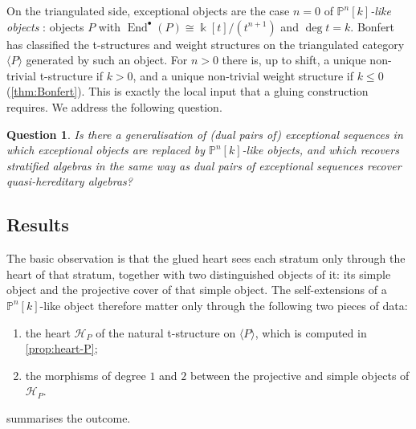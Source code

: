 \documentclass[11pt,reqno]{amsart}
\theoremstyle{plain}
\newtheorem{question}[theorem]{Question}
\theoremstyle{definition}
\theoremstyle{remark}
\newcommand{\kk}{\Bbbk}
\DeclareMathOperator{\End}{End}
\newcommand{\thick}[1]{\langle #1\rangle}
\newcommand{\Pn}[2]{\mathbb{P}^{#1}[#2]}
\newcommand{\cH}{\mathcal{H}}
\begin{document}
On the triangulated side, exceptional objects are the case $n=0$ of \emph{$\Pn{n}{k}$-like objects} \cite{HT06,Kru18,HK19}: objects $P$ with $\End^\bullet(P)\cong\kk[t]/(t^{n+1})$ and $\deg t=k$. Bonfert \cite{Bonf26} has classified the t-structures and weight structures on the triangulated category $\thick{P}$ generated by such an object. For $n>0$ there is, up to shift, a unique non-trivial t-structure if $k>0$, and a unique non-trivial weight structure if $k\le0$ (\cref{thm:Bonfert}). This is exactly the local input that a gluing construction requires. We address the following question.

\begin{question}\label{q:main}
Is there a generalisation of (dual pairs of) exceptional sequences in which exceptional objects are replaced by $\Pn{n}{k}$-like objects, and which recovers stratified algebras in the same way as dual pairs of exceptional sequences recover quasi-hereditary algebras?
\end{question}

\subsection{Results}
The basic observation is that the glued heart sees each stratum only through the heart of that stratum, together with two distinguished objects of it: its simple object and the projective cover of that simple object. The self-extensions of a $\Pn{n}{k}$-like object therefore matter only through the following two pieces of data:
\begin{enumerate}[label=(\roman*)]
\item the heart $\cH_P$ of the natural t-structure on $\thick{P}$, which is computed in \cref{prop:heart-P};
\item the morphisms of degree $1$ and $2$ between the projective and simple objects of $\cH_P$.
\end{enumerate}
 summarises the outcome.
\end{document}
